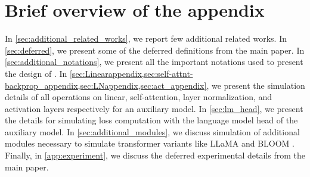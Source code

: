 

\section*{Brief overview of the appendix}
In \cref{sec:additional_related_works}, we report few additional related works. In \cref{sec:deferred}, we present some of the deferred definitions from the main paper. In \cref{sec:additional_notations}, we present all the important notations used to present the design of \simulator{}. In \cref{sec:Linearappendix,sec:self-attnt-backprop_appendix,sec:LNappendix,sec:act_appendix}, we present the simulation details of all operations on linear, self-attention, layer normalization, and activation layers respectively for an auxiliary model. In \cref{sec:lm_head}, we present the details for simulating loss computation with the language model head of the auxiliary model. In \cref{sec:additional_modules}, we discuss simulation of additional modules necessary to simulate transformer variants like LLaMA \cite{touvron2023llama} and BLOOM \cite{scao2022bloom}. Finally, in \cref{app:experiment}, we discuss the deferred experimental details from the main paper. 
























